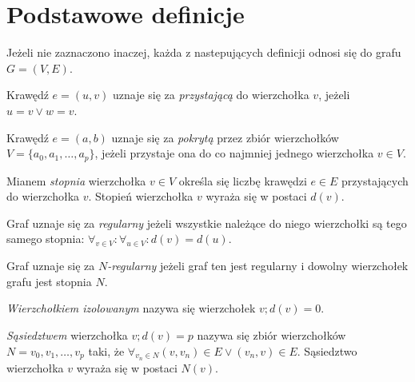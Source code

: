 \section{Podstawowe definicje}\label{s_definitions}

Jeżeli nie zaznaczono inaczej, każda z nastepujących definicji odnosi się do
grafu $G=(V,E)$.

\begin{definition}
  Krawędź $e=(u,v)$ uznaje się za \emph{przystającą} do wierzchołka $v$,
  jeżeli $u=v \lor w=v$.
\end{definition}

\begin{definition}
  Krawędź $e=(a,b)$ uznaje się za \emph{pokrytą} przez zbiór wierzchołków \\
  $V=\{a_0, a_1, \ldots, a_p\}$, jeżeli przystaje ona do co najmniej jednego
  wierzchołka $v \in V$.
\end{definition}

\begin{definition}
  Mianem \emph{stopnia} wierzchołka $v \in V$ określa się 
  liczbę krawędzi $e \in E$ przystających do wierzchołka $v$.
  Stopień wierzchołka $v$ wyraża się w postaci $d(v)$.
\end{definition}

\begin{definition}
  Graf uznaje się za \emph{regularny} jeżeli wszystkie należące do niego wierzchołki są tego samego stopnia: $\forall_{v \in V}: \forall_{u \in V}:{d(v)=d(u)}$.
\end{definition}

\begin{definition}
  Graf uznaje się za \emph{$N$-regularny} jeżeli graf ten jest regularny i dowolny wierzchołek grafu jest stopnia $N$.
\end{definition}

\begin{definition}
  \emph{Wierzchołkiem izolowanym} nazywa się wierzchołek $v; d(v)=0$.
\end{definition}

\begin{definition}
  \emph{Sąsiedztwem} wierzchołka $v; d(v)=p$ nazywa się zbiór 
  wierzchołków $N={v_0, v_1, \ldots, v_p}$ taki, że 
  $\forall_{v_n \in N}{(v,v_n) \in E \lor (v_n,v) \in E}$.
  Sąsiedztwo wierzchołka $v$ wyraża się w postaci $N(v)$.
\end{definition}

